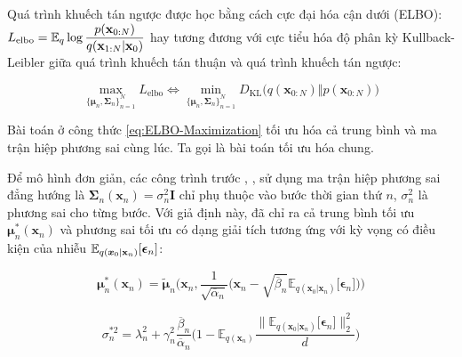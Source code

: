 \documentclass[14pt, a4paper]{article}
\numberwithin{equation}{section}
\numberwithin{figure}{section}
\numberwithin{dl}{section}
\numberwithin{md}{section}
\numberwithin{bd}{section}
\numberwithin{dn}{section}
\numberwithin{hq}{section}
\begin{document}
    Quá trình khuếch tán ngược được học bằng cách cực đại hóa cận dưới (ELBO): $L_{\mathrm{elbo}}=\mathbb{E}_q \log \dfrac{p(\bold{x}_{0:N})}{q(\bold{x}_{1:N}\vert \bold{x}_0)}$ hay tương đương với cực tiểu hóa độ phân kỳ Kullback-Leibler giữa quá trình khuếch tán thuận và quá trình khuếch tán ngược:

    \begin{equation} \label{eq:ELBO-Maximization}
        \max_{\lbrace \boldsymbol{\mu}_n, \boldsymbol{\Sigma}_n \rbrace_{n=1}^N} L_{\mathrm{elbo}} \Leftrightarrow \min_{\lbrace \boldsymbol{\mu}_n, \boldsymbol{\Sigma}_n \rbrace_{n=1}^N} D_{\mathrm{KL}} \big( q(\boldsymbol{x}_{0:N}) \Vert p(\boldsymbol{x}_{0:N}) \big)
    \end{equation}

    Bài toán ở công thức \ref{eq:ELBO-Maximization} tối ưu hóa cả trung bình và ma trận hiệp phương sai cùng lúc. 
    Ta gọi là bài toán tối ưu hóa chung.

    Để mô hình đơn giản, các công trình trước \cite{ho2020denoising}, \cite{song2020denoising}, \cite{bao2021analytic} sử dụng ma trận hiệp phương sai đẳng hướng là $\boldsymbol{\Sigma}_n(\boldsymbol{x}_n)=\sigma_n^2 \boldsymbol{I}$ chỉ phụ thuộc vào bước thời gian thứ $n$, $\sigma_n^2$ là phương sai cho từng bước.
    Với giả định này, \cite{bao2021analytic} đã chỉ ra cả trung bình tối ưu $\boldsymbol{\mu}_n^{\ast} (\boldsymbol{x}_n)$ và phương sai tối ưu có dạng giải tích tương ứng với kỳ vọng có điều kiện của nhiễu $\mathbb{E}_{q( \boldsymbol{x}_0 \vert \bold{x}_n )} \lbrack \boldsymbol{\epsilon}_n \rbrack$:

    \begin{equation} \label{eq:Optimal-Mean}
        \boldsymbol{\mu}_n^{\ast} (\boldsymbol{x}_n)=\tilde{\boldsymbol{\mu}}_n \Bigg( \boldsymbol{x}_n, \dfrac{1}{\sqrt{\overline{\alpha}_n}} \Big( \boldsymbol{x}_n - \sqrt{\overline{\beta}_n} \mathbb{E}_{q(\boldsymbol{x}_0 \vert \boldsymbol{x}_n)} \lbrack \boldsymbol{\epsilon}_n \rbrack \Big) \Bigg)
    \end{equation}

    \begin{equation} \label{eq:Optimal-Isotropic-Variance}
        \sigma_n^{\ast 2}=\lambda_n^2 + \gamma_n^2 \dfrac{\overline{\beta}_n}{\overline{\alpha}_n} \Bigg( 1 - \mathbb{E}_{q(\boldsymbol{x}_n)} \dfrac{\lVert \mathbb{E}_{q(\boldsymbol{x}_0 \vert \boldsymbol{x}_n)} \lbrack \boldsymbol{\epsilon}_n \rbrack\rVert_2^2}{d} \Bigg)
    \end{equation}
\end{document}
